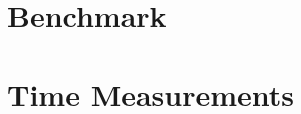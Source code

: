 \documentclass[float=true, crop=false]{standalone}
\begin{document}
\section{Benchmark}
\section{Time Measurements}
\end{document}
